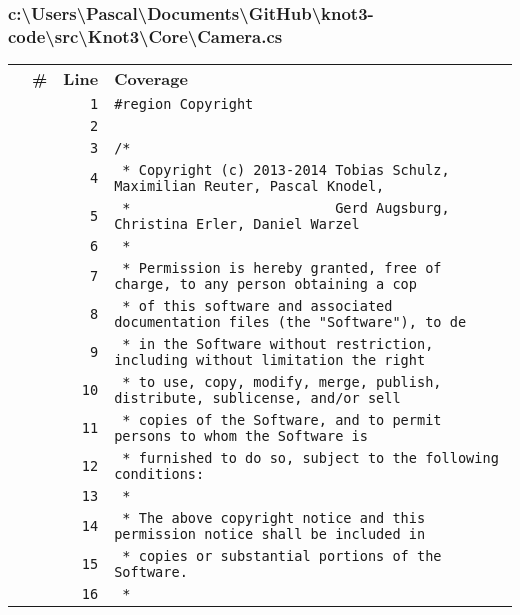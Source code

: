 \documentclass[a4paper,10pt]{article}
\begin{document}
\subsubsection{c:\textbackslash Users\textbackslash Pascal\textbackslash Documents\textbackslash GitHub\textbackslash knot3-code\textbackslash src\textbackslash Knot3\textbackslash Core\textbackslash Camera.cs}
\begin{longtable}[l]{lrrl}
\textbf{} & \textbf{\#} & \textbf{Line} & \textbf{Coverage}\\
\cellcolor{gray} &  & \verb~1~ & \verb~#region Copyright~\\
\cellcolor{gray} &  & \verb~2~ & \verb~~\\
\cellcolor{gray} &  & \verb~3~ & \verb~/*~\\
\cellcolor{gray} &  & \verb~4~ & \verb~ * Copyright (c) 2013-2014 Tobias Schulz, Maximilian Reuter, Pascal Knodel,~\\
\cellcolor{gray} &  & \verb~5~ & \verb~ *                         Gerd Augsburg, Christina Erler, Daniel Warzel~\\
\cellcolor{gray} &  & \verb~6~ & \verb~ *~\\
\cellcolor{gray} &  & \verb~7~ & \verb~ * Permission is hereby granted, free of charge, to any person obtaining a cop~\\
\cellcolor{gray} &  & \verb~8~ & \verb~ * of this software and associated documentation files (the "Software"), to de~\\
\cellcolor{gray} &  & \verb~9~ & \verb~ * in the Software without restriction, including without limitation the right~\\
\cellcolor{gray} &  & \verb~10~ & \verb~ * to use, copy, modify, merge, publish, distribute, sublicense, and/or sell~\\
\cellcolor{gray} &  & \verb~11~ & \verb~ * copies of the Software, and to permit persons to whom the Software is~\\
\cellcolor{gray} &  & \verb~12~ & \verb~ * furnished to do so, subject to the following conditions:~\\
\cellcolor{gray} &  & \verb~13~ & \verb~ *~\\
\cellcolor{gray} &  & \verb~14~ & \verb~ * The above copyright notice and this permission notice shall be included in ~\\
\cellcolor{gray} &  & \verb~15~ & \verb~ * copies or substantial portions of the Software.~\\
\cellcolor{gray} &  & \verb~16~ & \verb~ *~\\

\end{longtable}
\end{document}
